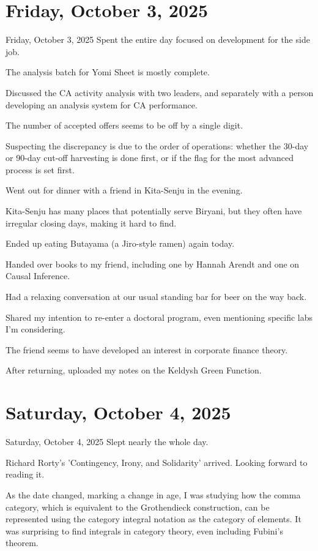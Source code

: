 \documentclass[dvipdfmx, autodetect-engine, aspectratio=169, 10.5pt]{beamer}
\begin{document}
\section{Friday, October 3, 2025}

\begin{frame}{Friday, October 3, 2025}
	Spent the entire day focused on development for the side job.

	The analysis batch for Yomi Sheet is mostly complete.

	Discussed the CA activity analysis with two leaders, and separately with a person developing an analysis system for CA performance.

	The number of accepted offers seems to be off by a single digit.

	Suspecting the discrepancy is due to the order of operations: whether the 30-day or 90-day cut-off harvesting is done first, or if the flag for the most advanced process is set first.

	Went out for dinner with a friend in Kita-Senju in the evening.

	Kita-Senju has many places that potentially serve Biryani, but they often have irregular closing days, making it hard to find.

	Ended up eating Butayama (a Jiro-style ramen) again today.

	Handed over books to my friend, including one by Hannah Arendt and one on Causal Inference.

	Had a relaxing conversation at our usual standing bar for beer on the way back.

	Shared my intention to re-enter a doctoral program, even mentioning specific labs I'm considering.

	The friend seems to have developed an interest in corporate finance theory.

	After returning, uploaded my notes on the Keldysh Green Function.
\end{frame}

\section{Saturday, October 4, 2025}

\begin{frame}{Saturday, October 4, 2025}
	Slept nearly the whole day.

	Richard Rorty's 'Contingency, Irony, and Solidarity' arrived. Looking forward to reading it.

	As the date changed, marking a change in age, I was studying how the comma category, which is equivalent to the Grothendieck construction, can be represented using the category integral notation as the category of elements.
	It was surprising to find integrals in category theory, even including Fubini's theorem.
\end{frame}
\end{document}
